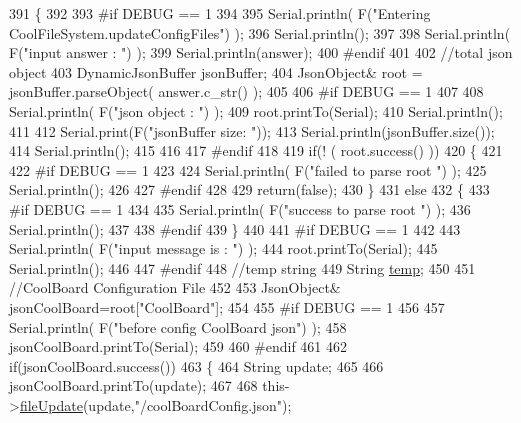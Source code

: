 \begin{DoxyCode}
391 \{
392 
393 \textcolor{preprocessor}{#if DEBUG == 1}
394 
395     Serial.println( F(\textcolor{stringliteral}{"Entering CoolFileSystem.updateConfigFiles"}) );
396     Serial.println();
397     
398     Serial.println( F(\textcolor{stringliteral}{"input answer : "}) );
399     Serial.println(answer);
400 \textcolor{preprocessor}{#endif}
401 
402     \textcolor{comment}{//total json object }
403     DynamicJsonBuffer jsonBuffer;
404     JsonObject& root = jsonBuffer.parseObject( answer.c\_str() );
405 
406 \textcolor{preprocessor}{#if DEBUG == 1}
407     
408     Serial.println( F(\textcolor{stringliteral}{"json object : "}) );  
409     root.printTo(Serial);
410     Serial.println();
411     
412     Serial.print(F(\textcolor{stringliteral}{"jsonBuffer size: "}));
413     Serial.println(jsonBuffer.size());
414     Serial.println();
415 
416 
417 \textcolor{preprocessor}{#endif}
418 
419     \textcolor{keywordflow}{if}(! ( root.success() ))
420     \{
421     
422 \textcolor{preprocessor}{    #if DEBUG == 1}
423 
424         Serial.println( F(\textcolor{stringliteral}{"failed to parse root "}) );
425         Serial.println();
426     
427 \textcolor{preprocessor}{    #endif}
428 
429         \textcolor{keywordflow}{return}(\textcolor{keyword}{false});
430     \}
431     \textcolor{keywordflow}{else}
432     \{
433 \textcolor{preprocessor}{    #if DEBUG == 1}
434         
435         Serial.println( F(\textcolor{stringliteral}{"success to parse root "}) );
436         Serial.println();
437         
438 \textcolor{preprocessor}{    #endif  }
439     \}
440     
441 \textcolor{preprocessor}{#if DEBUG == 1}
442 
443     Serial.println( F(\textcolor{stringliteral}{"input message is : "}) );
444     root.printTo(Serial);
445     Serial.println();
446 
447 \textcolor{preprocessor}{#endif}
448     \textcolor{comment}{//temp string}
449     String \hyperlink{_irene3000_8h_a5905d48604152cf57aa6bfa087b49173}{temp};
450 
451     \textcolor{comment}{//CoolBoard Configuration File}
452 
453         JsonObject& jsonCoolBoard=root[\textcolor{stringliteral}{"CoolBoard"}];
454 
455 \textcolor{preprocessor}{#if DEBUG == 1}
456 
457     Serial.println( F(\textcolor{stringliteral}{"before config CoolBoard json"}) );
458     jsonCoolBoard.printTo(Serial);
459 
460 \textcolor{preprocessor}{#endif}
461 
462     \textcolor{keywordflow}{if}(jsonCoolBoard.success())
463     \{
464         String update;
465     
466         jsonCoolBoard.printTo(update);
467 
468         this->\hyperlink{class_cool_file_system_a13f2958f5b87757c31fc53797a30d23a}{fileUpdate}(update,\textcolor{stringliteral}{"/coolBoardConfig.json"});     

\end{DoxyCode}
